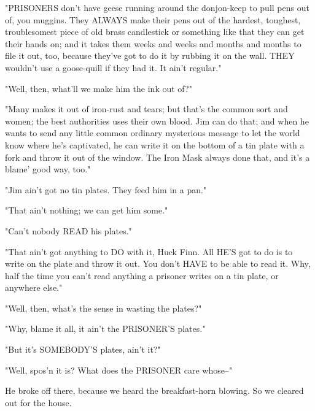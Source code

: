 "PRISONERS don't have geese running around the donjon-keep to pull pens
out of, you muggins.  They ALWAYS make their pens out of the hardest,
toughest, troublesomest piece of old brass candlestick or something like
that they can get their hands on; and it takes them weeks and weeks and
months and months to file it out, too, because they've got to do it by
rubbing it on the wall.  THEY wouldn't use a goose-quill if they had it.
It ain't regular."

"Well, then, what'll we make him the ink out of?"

"Many makes it out of iron-rust and tears; but that's the common sort and
women; the best authorities uses their own blood.  Jim can do that; and
when he wants to send any little common ordinary mysterious message to
let the world know where he's captivated, he can write it on the bottom
of a tin plate with a fork and throw it out of the window.  The Iron Mask
always done that, and it's a blame' good way, too."

"Jim ain't got no tin plates.  They feed him in a pan."

"That ain't nothing; we can get him some."

"Can't nobody READ his plates."

"That ain't got anything to DO with it, Huck Finn.  All HE'S got to do is
to write on the plate and throw it out.  You don't HAVE to be able to
read it. Why, half the time you can't read anything a prisoner writes on
a tin plate, or anywhere else."

"Well, then, what's the sense in wasting the plates?"

"Why, blame it all, it ain't the PRISONER'S plates."

"But it's SOMEBODY'S plates, ain't it?"

"Well, spos'n it is?  What does the PRISONER care whose--"

He broke off there, because we heard the breakfast-horn blowing.  So we
cleared out for the house.

